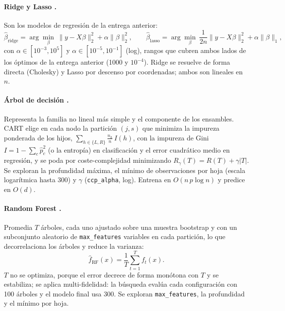 \documentclass[pdflatex,sn-mathphys-num]{sn-jnl}
\begin{document}
\paragraph{Ridge y Lasso \cite{hoerl1970ridge,tibshirani1996lasso}.}
Son los modelos de regresión de la entrega anterior:
\begin{equation}
\hat\beta_{\mathrm{ridge}}=\arg\min_\beta\ \|y-X\beta\|_2^2+\alpha\|\beta\|_2^2,\qquad
\hat\beta_{\mathrm{lasso}}=\arg\min_\beta\ \frac{1}{2n}\|y-X\beta\|_2^2+\alpha\|\beta\|_1,
\end{equation}
con $\alpha\in[10^{-3},10^{5}]$ y $\alpha\in[10^{-5},10^{-1}]$ (log), rangos que cubren ambos lados de los óptimos de la entrega anterior (1000 y $10^{-4}$). Ridge se resuelve de forma directa (Cholesky) y Lasso por descenso por coordenadas; ambos son lineales en $n$.

\paragraph{Árbol de decisión \cite{breiman1984cart}.}
Representa la familia no lineal más simple y el componente de los ensambles. CART elige en cada nodo la partición $(j,s)$ que minimiza la impureza ponderada de los hijos, $\sum_{h\in\{L,R\}}\frac{n_h}{n}\,I(h)$, con la impureza de Gini $I=1-\sum_c \hat p_c^2$ (o la entropía) en clasificación y el error cuadrático medio en regresión, y se poda por coste-complejidad minimizando $R_\gamma(T)=R(T)+\gamma|T|$. Se exploran la profundidad máxima, el mínimo de observaciones por hoja (escala logarítmica hasta 300) y $\gamma$ (\texttt{ccp\_alpha}, log). Entrena en $O(n\,p\log n)$ y predice en $O(d)$.

\paragraph{Random Forest \cite{breiman2001rf}.}
Promedia $T$ árboles, cada uno ajustado sobre una muestra bootstrap y con un subconjunto aleatorio de \texttt{max\_features} variables en cada partición, lo que decorrelaciona los árboles y reduce la varianza:
\begin{equation}
\hat{f}_{\mathrm{RF}}(x)=\frac{1}{T}\sum_{t=1}^{T} f_t(x).
\end{equation}
$T$ no se optimiza, porque el error decrece de forma monótona con $T$ y se estabiliza; se aplica multi-fidelidad: la búsqueda evalúa cada configuración con 100 árboles y el modelo final usa 300. Se exploran \texttt{max\_features}, la profundidad y el mínimo por hoja.
\end{document}
